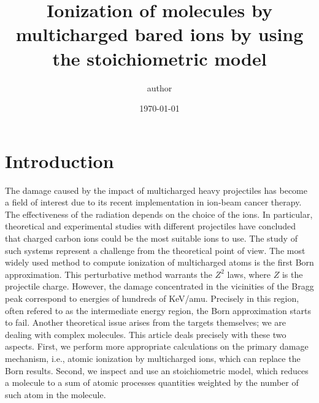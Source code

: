 \documentclass[preprint,12pt]{article}
\begin{document}
\title{Ionization of molecules by multicharged bared ions by using the
stoichiometric model}
\author{author}
\date{\today }



\maketitle

\begin{abstract}
\end{abstract}


\section{Introduction}

The damage caused by the impact of multicharged heavy projectiles has 
become a field of interest due to its recent implementation in ion-beam 
cancer therapy. The effectiveness of the radiation depends on the 
choice of the ions. In particular, theoretical and experimental studies 
with different projectiles have concluded that charged carbon ions 
could be the most suitable ions to use. The study of such systems 
represent a challenge from the theoretical point of view. The most 
widely used method to compute ionization of multicharged atoms is the 
first Born approximation. 
This perturbative method warrants the $Z^{2}$ laws, where $Z$ is the 
projectile charge. However, the damage concentrated in the vicinities 
of the Bragg peak correspond to energies of hundreds of KeV/amu. 
Precisely in this region, often refered to as the intermediate energy 
region, the Born approximation starts to fail. Another theoretical 
issue arises from the targets themselves; we are dealing with complex 
molecules. This article deals precisely with these two aspects. 
First, we perform more appropriate calculations on the primary damage 
mechanism, i.e., atomic ionization by multicharged ions, which can 
replace the Born results. Second, we inspect and use an stoichiometric 
model, which reduces a molecule to a sum of atomic processes quantities 
weighted by the number of such atom in the molecule.
\end{document}
